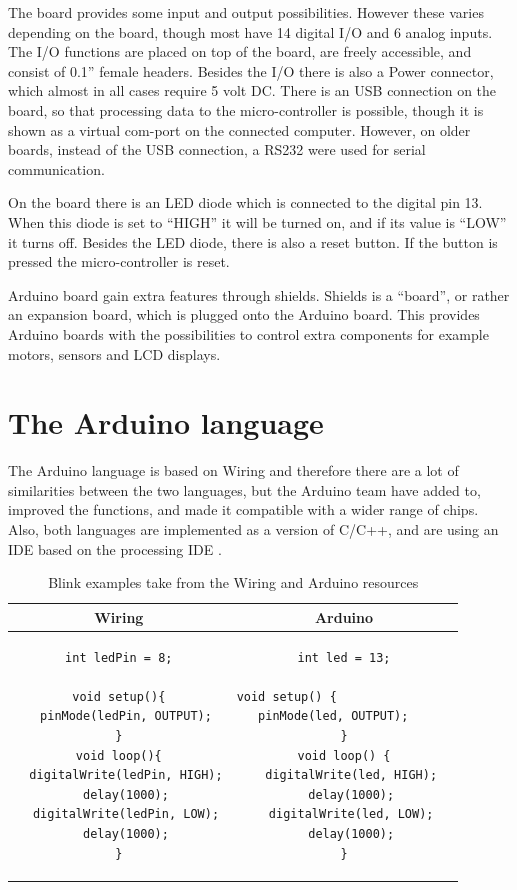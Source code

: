 The board provides some input and output possibilities. However these varies depending on the board, though most have 14 digital I/O and 6 analog inputs. The I/O functions are placed on top of the board, are freely accessible, and consist of 0.1'' female headers. Besides the I/O there is also a Power connector, which almost in all cases require 5 volt DC. There is an USB connection on the board, so that processing data to the micro-controller is possible, though it is shown as a virtual com-port on the connected computer. However, on older boards, instead of the USB connection, a RS232 were used for serial communication. 

On the board there is an LED diode which is connected to the digital pin 13. When this diode is set to ``HIGH'' it will be turned on, and if its value is ``LOW'' it turns off. Besides the LED diode, there is also a reset button. If the button is pressed the micro-controller is reset. 

Arduino board gain extra features through shields. Shields is a ``board'', or rather an expansion board, which is plugged onto the Arduino board. This provides Arduino boards with the possibilities to control extra components for example motors, sensors and LCD displays.

\section{The Arduino language}
The Arduino language is based on Wiring and therefore there are a lot of similarities between the two languages, but the Arduino team have added to, improved the functions, and made it compatible with a wider range of chips. Also, both languages are implemented as a  version of C/C++, and are using an IDE based on the processing IDE \cite{Wiring:thesis}\cite{Arduino:IDE}.\\

\begin{table}[H]
\centering
\begin{tabular}{cc}
Wiring 
& 
Arduino \\ 
\hline 
\begin{lstlisting}
int ledPin = 8;

void setup(){
  pinMode(ledPin, OUTPUT);
}
void loop(){
  digitalWrite(ledPin, HIGH);
  delay(1000);
  digitalWrite(ledPin, LOW);
  delay(1000);
}
\end{lstlisting}  
& 
\begin{lstlisting}
int led = 13;

void setup() {                
  pinMode(led, OUTPUT);     
}
void loop() {
  digitalWrite(led, HIGH);
  delay(1000);
  digitalWrite(led, LOW);
  delay(1000);
}
\end{lstlisting} 
\end{tabular} 
\caption{Blink examples take from the Wiring and Arduino resources}
\label{tabel:comparison}
\end{table}

